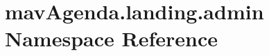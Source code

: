 \hypertarget{namespacemavAgenda_1_1landing_1_1admin}{}\section{mav\+Agenda.\+landing.\+admin Namespace Reference}
\label{namespacemavAgenda_1_1landing_1_1admin}

